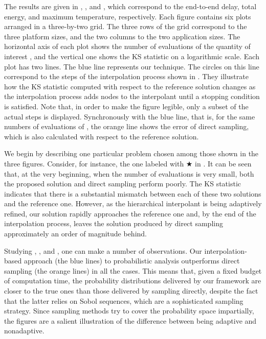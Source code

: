 The results are given in ,
, and , which
correspond to the end-to-end delay, total energy, and maximum temperature,
respectively. Each figure contains six plots arranged in a three-by-two grid.
The three rows of the grid correspond to the three platform sizes, and the two
columns to the two application sizes. The horizontal axis of each plot shows the
number of evaluations of the quantity of interest \g, and the vertical one shows
the \ac{KS} statistic on a logarithmic scale. Each plot has two lines. The blue
line represents our technique. The circles on this line correspond to the steps
of the interpolation process shown in . They illustrate
how the \ac{KS} statistic computed with respect to the reference solution
changes as the interpolation process adds nodes to the interpolant until a
stopping condition is satisfied. Note that, in order to make the figure legible,
only a subset of the actual steps is displayed. Synchronously with the blue
line, that is, for the same numbers of evaluations of \g, the orange line shows
the error of direct sampling, which is also calculated with respect to the
reference solution.

We begin by describing one particular problem chosen among those shown in the
three figures. Consider, for instance, the one labeled with $\bigstar$ in
. It can be seen that, at the very beginning, when
the number of evaluations is very small, both the proposed solution and direct
sampling perform poorly. The \ac{KS} statistic indicates that there is a
substantial mismatch between each of these two solutions and the reference one.
However, as the hierarchical interpolant is being adaptively refined, our
solution rapidly approaches the reference one and, by the end of the
interpolation process, leaves the solution produced by direct sampling
approximately an order of magnitude behind.

Studying , , and
, one can make a number of observations. Our
interpolation-based approach (the blue lines) to probabilistic analysis
outperforms direct sampling (the orange lines) in all the cases. This means
that, given a fixed budget of computation time, the probability distributions
delivered by our framework are closer to the true ones than those delivered by
sampling \g directly, despite the fact that the latter relies on Sobol
sequences, which are a sophisticated sampling strategy. Since sampling methods
try to cover the probability space impartially, the figures are a salient
illustration of the difference between being adaptive and nonadaptive.

